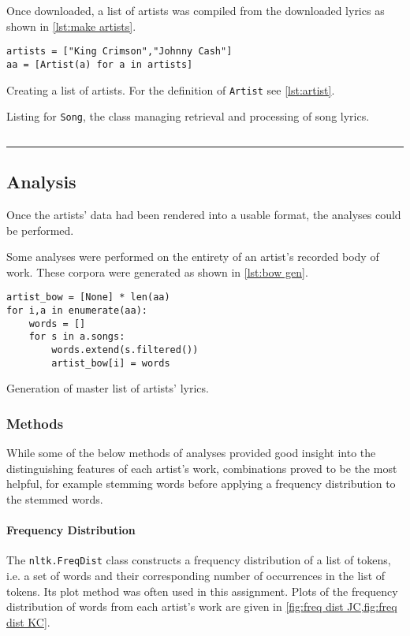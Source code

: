  Once downloaded, a list of artists was compiled from the downloaded lyrics as shown in \cref{lst:make artists}.
\begin{listing}[h]
\begin{verbatim}
artists = ["King Crimson","Johnny Cash"]
aa = [Artist(a) for a in artists]
\end{verbatim}
\caption{Creating a list of artists. For the definition of \texttt{Artist} see \cref{lst:artist}.}
\label{lst:make artists}
\end{listing}
\begin{listing*}%
	\centering%
	\caption{Listing for \texttt{Song}, the class managing retrieval and processing of song lyrics.}%
	\inputminted{python}{src/Song.py}
	\label{lst:song}%
	\hrule
\end{listing*}
\subsection{Analysis}
Once the artists' data had been rendered into a usable format, the analyses could be performed.

Some analyses were performed on the entirety of an artist's recorded body of work. These corpora were generated as shown in \cref{lst:bow gen}.

\begin{listing}[h]
\begin{verbatim}
artist_bow = [None] * len(aa)
for i,a in enumerate(aa):
	words = []
	for s in a.songs:
		words.extend(s.filtered())
		artist_bow[i] = words
\end{verbatim}
\caption{Generation of master list of artists' lyrics.}
\label{lst:bow gen}
\end{listing}

\subsubsection{Methods}
While some of the below methods of analyses provided good insight into the distinguishing features of each artist's work, combinations proved to be the most helpful, for example stemming words before applying a frequency distribution to the stemmed words.
\paragraph{Frequency Distribution}

The \texttt{nltk.FreqDist} class constructs a frequency distribution of a list of tokens, i.e. a set of words and their corresponding number of occurrences in the list of tokens. Its plot method was often used in this assignment. Plots of the frequency distribution of words from each artist's work are given in \cref{fig:freq dist JC,fig:freq dist KC}. 

